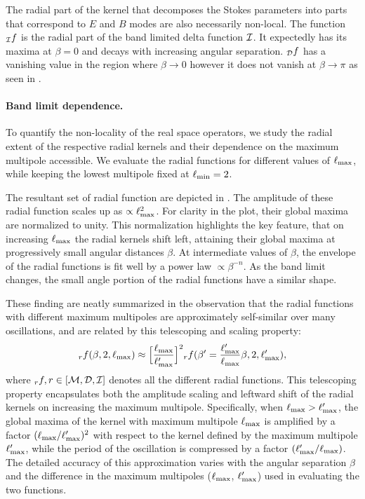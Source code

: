 The radial part of the kernel that decomposes the  Stokes parameters into parts that correspond to $E$ and $B$ modes  are also  necessarily non-local.  The function ${_{\mathcal{I}}f}$ is the radial part of the band limited delta function $\mathcal{I}$.  It expectedly has its maxima at $\beta=0$ and decays with increasing angular separation.  ${_{\mathcal{D}}f}$ has a vanishing value in the region where $\beta \rightarrow 0$ however it does not vanish at $\beta \rightarrow \pi$ as seen in .

\paragraph{Band limit dependence.} 
To quantify the non-locality of the real space operators, we study the radial extent of the respective radial kernels and their dependence on the maximum multipole accessible. We evaluate the radial functions for different values of $\ell_{\rm max}$, while keeping the lowest multipole fixed at $\ell_{\rm min}=2$. 

The resultant set of radial function are depicted in . The amplitude of these radial function scales up as $\propto \ell_{\rm max}^2$.  For clarity in the plot, their global maxima are normalized to unity.  This normalization highlights the key feature, that on increasing $\ell_{\rm max}$ the radial kernels shift left, attaining their global maxima at progressively small angular distances $\beta$.  At intermediate values of $\beta$, the envelope of the radial functions is fit well by a power law $ \propto \beta^{-n}$.  As the band limit changes, the small angle portion of the radial functions have a similar shape.

These finding are neatly summarized in the observation that the radial functions with different maximum multipoles are approximately self-similar over many oscillations, and are related by this telescoping and scaling property:
\begin{equation}{}_rf(\beta,2,\ell_{\rm max}) \approx \Big[\frac{\ell_{\rm max}}{\ell'_{\rm max}}\Big]^2{}_rf(\beta'=\frac{\ell'_{\rm max}}{\ell_{\rm max}} \beta ,2,\ell'_{\rm max}),\end{equation}
where ${}_rf , r \in [\mathcal{M}, \mathcal{D},\mathcal{I}]$ denotes all the different radial functions. This telescoping property encapsulates both the amplitude scaling and leftward shift of the radial kernels on increasing the maximum multipole. {Specifically, when $\ell_{\rm max} > \ell'_{\rm max}$, the global maxima of the kernel with maximum multipole $\ell_{\rm max}$ is amplified by a factor $(\ell_{\rm max}/\ell'_{\rm max})^2$ with respect to the kernel defined by the maximum multipole $\ell'_{\rm max}$, while the period of the oscillation is compressed by a factor $(\ell'_{\rm max}/\ell_{\rm max})$. The detailed accuracy of this approximation varies with the angular separation $\beta$ and the difference in the maximum multipoles ($\ell_{\rm max}$, $\ell'_{\rm max}$)  used in evaluating the two functions.}

